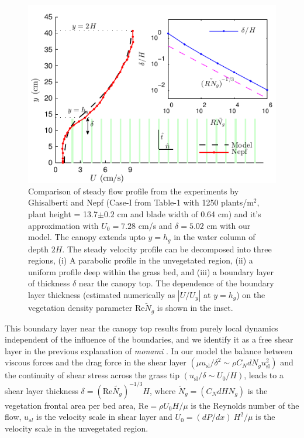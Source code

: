 \documentclass[aps,prl,twocolumn,superscriptaddress,10pt]{revtex4-1}  %
\newcommand{\hg}{h_g}
\newcommand{\Rey}{\text{Re}}
\newcommand{\Ndg}{\tilde{N}_g}
\newcommand{\monami}{\textit{monami }}
\begin{document}
\begin{figure}
\includegraphics[scale=1]{Grass_Base_Nepf_shear}
\caption{Comparison of steady flow profile from the experiments by Ghisalberti and Nepf \cite{Nepf04} (Case-I from Table-1 with 1250 plants/m$^2$, 
plant height = 13.7$\pm 0.2$ cm and blade width of 0.64 cm)
 and it's approximation with $U_0=7.28$ cm/s and $\delta = 5.02$ cm with our model. The canopy extends upto $y=h_g$ in the water column of depth $2H$. 
The steady velocity profile can be decomposed into three regions, (i) A parabolic profile in the unvegetated region, (ii) a uniform profile deep within the grass bed, and (iii) a boundary layer of thickness $\delta$ near the canopy top. 
The dependence of the boundary layer thickness (estimated numerically as $|U/U_y|$ at $y=\hg$) on the vegetation density parameter $\Rey \Ndg$ is shown in the inset.}
\label{basicflow}
\end{figure}
This boundary layer near the canopy top results from purely local dynamics independent of the influence of the boundaries, and we identify it as a free shear layer \cite{Ghisal02} in the previous explanation of \monami. 
In our model the balance between viscous forces and the drag force in the shear layer $(\mu u_\text{sl}/\delta^2 \sim \rho C_N d N_g u_\text{sl}^2)$ and the continuity of shear stress across the grass tip $(u_\text{sl}/\delta \sim U_0/H)$, leads to a shear layer thickness $\delta=(\Rey\tilde{N_g})^{-1/3}H$, where $\Ndg = \left(C_N d H N_g\right)$ is the vegetation frontal area per bed area, $\Rey=\rho U_0 H/\mu$ is the Reynolds number of the flow, $u_{sl}$ is the velocity scale in shear layer and $U_0 = {(dP/dx)~H^2}/{\mu}$ is the velocity scale in the unvegetated region. 
\end{document}

